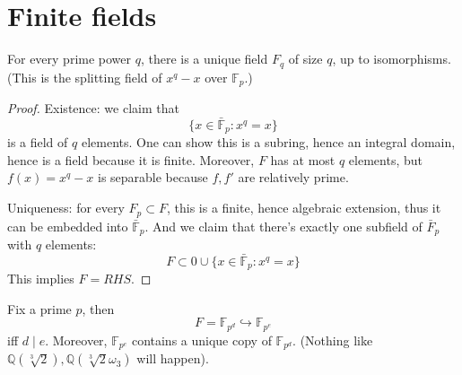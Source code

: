 \documentclass[openany]{book}
\newcommand{\Z}{\mathbb{Z}}
\newcommand{\F}{\mathbb{F}}
\newcommand{\Q}{\mathbb{Q}}
\newcommand{\om}{\omega}
\begin{document}


\section{Finite fields}



\begin{prop}
    For every prime power $q$, there is a unique field $F_q$ of size $q$, up to isomorphisms. (This is the splitting field of $x^q-x$ over $\F_p$.)
\end{prop}
\begin{proof}
    Existence: we claim that 
    \begin{equation*}
        \{x\in\bar{\F}_p: x^q=x\}
    \end{equation*}
    is a field of $q$ elements. One can show this is a subring, hence an integral domain, hence is a field because it is finite. Moreover, $F$ has at most $q$ elements, but $f(x)=x^q-x$ is separable because $f,f'$ are relatively prime. 

    Uniqueness: for every $F_p\subset F$, this is a finite, hence algebraic extension, thus it can be embedded into $\bar{\F}_p$. And we claim that there's exactly one subfield of $\bar{F}_p$ with $q$ elements:
    \begin{equation*}
        F\subset 0\cup\{x\in\bar{\F}_p: x^q=x\}
    \end{equation*}
    This implies $F=RHS$.
    
    
    
    

\end{proof}

\begin{prop}
    Fix a prime $p$, then 
    \begin{equation*}
        F=\F_{p^d}\hookrightarrow \F_{p^e}
    \end{equation*}
    iff $d \mid e$. Moreover, $\F_{p^e}$ contains a unique copy of $\F_{p^d}$. (Nothing like $\Q(\sqrt[3]{2}), \Q(\sqrt[3]{2}\om_3)$ will happen). 
\end{prop}
\end{document}
